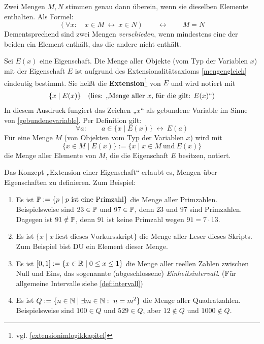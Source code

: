 \begin{axiom} \label{mengengleich} 
    Zwei Mengen $M,N$ stimmen genau dann überein, wenn sie dieselben Elemente enthalten. Als Formel:
        \[ (\forall x:\quad x\in M\ \leftrightarrow\ x\in N)\qquad\leftrightarrow\qquad M=N\]
    Dementsprechend sind zwei Mengen \emph{verschieden}, wenn mindestens eine der beiden ein Element enthält, das die andere nicht enthält.
\end{axiom}


\begin{defin} \label{def:extension} 
    Sei $E(x)$ eine Eigenschaft. Die Menge aller Objekte (vom Typ der Variablen $x$) mit der Eigenschaft $E$ ist aufgrund des Extensionalitätsaxioms \cref{mengengleich} eindeutig bestimmt. Sie heißt die \textbf{Extension}\footnote{vgl. \cref{extensionimlogikkapitel}} von $E$ und wird notiert mit
    \begin{align*}
        \{ x\mid E(x) \} && (\textnormal{lies: „Menge aller $x$, für die gilt: $E(x)$“})
    \end{align*}
    In diesem Ausdruck fungiert das Zeichen „$x$“ als gebundene Variable im Sinne von \cref{gebundenevariable}. Per Definition gilt:
        \[ \forall a:\qquad a\in \{x\mid E(x)\} \ \leftrightarrow\ E(a) \]
    Für eine Menge $M$ (von Objekten vom Typ der Variablen $x$) wird mit
        \[ \{ x\in M\mid E(x) \} := \{ x\mid x\in M\ \text{und}\ E(x)\} \]
    die Menge aller Elemente von $M$, die die Eigenschaft $E$ besitzen, notiert.
\end{defin}


\begin{bsp} \label{bsp:extension}
    Das Konzept „Extension einer Eigenschaft“ erlaubt es, Mengen über Eigenschaften zu definieren. Zum Beispiel:
    \begin{enumerate}
        \item Es ist $\mathbb P := \{p\mid p\ \text{ist eine Primzahl}\}$ die Menge aller Primzahlen. Beispielsweise sind $23\in \mathbb P$ und $97\in\mathbb P$, denn $23$ und $97$ sind Primzahlen. Dagegen ist $91\notin \mathbb P$, denn $91$ ist keine Primzahl wegen $91=7\cdot 13$.
        \item Es ist $\{ x\mid x\ \text{liest dieses Vorkursskript} \}$ die Menge aller Leser dieses Skripts. Zum Beispiel bist DU ein Element dieser Menge.
        \item Es ist $[0,1] := \{ x\in \mathbb R \mid 0\le x\le 1\}$ die Menge aller reellen Zahlen zwischen Null und Eins, das sogenannte (abgeschlossene) \emph{Einheitsintervall}. (Für allgemeine Intervalle siehe \cref{def:intervall})
        \item Es ist $Q:=\{ n\in \mathbb N \mid \exists m\in \mathbb N:\ n=m^2 \}$ die Menge aller Quadratzahlen. Beispielsweise sind $100\in Q$ und $529\in Q$, aber $12\notin Q$ und $1000\notin Q$.
    \end{enumerate}
\end{bsp}


